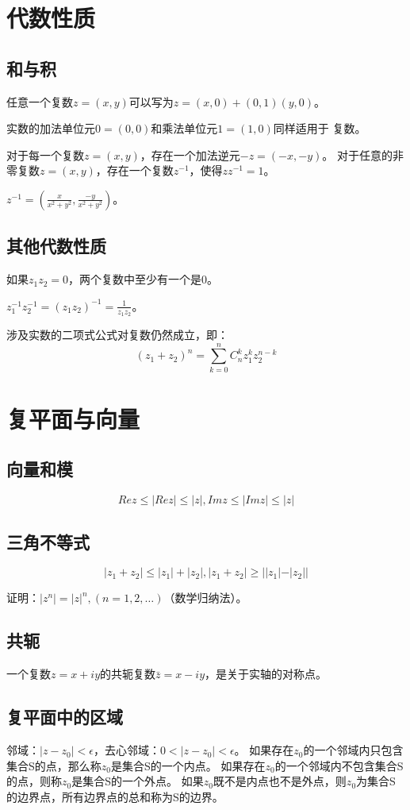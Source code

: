 \documentclass[UTF8]{article}
\begin{document}
    \section{代数性质}
        \subsection{和与积}
            任意一个复数$z=(x, y)$可以写为$z = (x, 0) + (0, 1)(y, 0)$。

            实数的加法单位元$0 = (0, 0)$和乘法单位元$1 = (1, 0)$同样适用于
            复数。

            对于每一个复数$z = (x, y)$，存在一个加法逆元$-z = (-x, -y)$。
            对于任意的非零复数$z = (x, y)$，存在一个复数$z^{-1}$，使得$zz^{-1} = 1$。

            $z^{-1} = (\frac{x}{x^2 + y^2}, \frac{-y}{x^2 + y^2})$。
        \subsection{其他代数性质}
            如果$z_1z_2 = 0$，两个复数中至少有一个是0。

            $z_1^{-1}z_2^{-1} = (z_1z_2)^{-1} = \frac{1}{z_1z_2}$。

            涉及实数的二项式公式对复数仍然成立，即：
            $$(z_1 + z_2)^n = \sum_{k = 0}^{n}C_n^kz_1^kz_2^{n - k}$$
    \section{复平面与向量}
        \subsection{向量和模}
            $$Rez \leq |Rez| \leq |z|, Imz \leq |Imz| \leq |z|$$
        \subsection{三角不等式}
            $$|z_1 + z_2| \leq |z_1| + |z_2|, |z_1 + z_2| \geq ||z_1| - |z_2||$$

            证明：$|z^n| = |z|^n, (n = 1, 2, \dots)$（数学归纳法）。
        \subsection{共轭}
            一个复数$z = x + iy$的共轭复数$\bar z = x -iy$，是关于实轴的对称点。
        \subsection{复平面中的区域}
            邻域：$|z - z_0| < \epsilon$，去心邻域：$0 < |z - z_0| < \epsilon$。
            如果存在$z_0$的一个邻域内只包含集合S的点，那么称$z_0$是集合S的一个内点。
            如果存在$z_0$的一个邻域内不包含集合S的点，则称$z_0$是集合S的一个外点。
            如果$z_0$既不是内点也不是外点，则$z_0$为集合S的边界点，所有边界点的总和称为S的边界。
\end{document}
